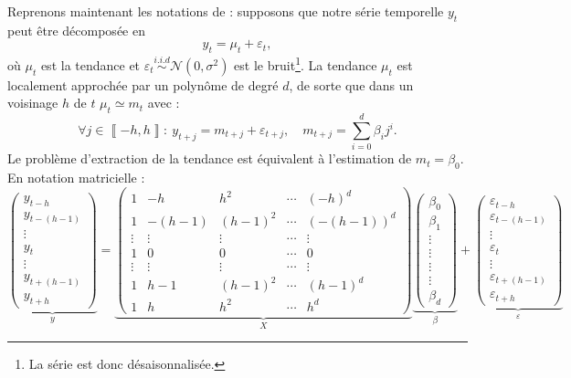 \documentclass[
  12pt,
  french,
  12pt,a4paper]{article}
\newcommand\1{\mathds{1}}
\begin{document}
Reprenons maintenant les notations de \textcite{proietti2008} : supposons que notre série temporelle \(y_t\) peut être décomposée en
\[
y_t=\mu_t+\varepsilon_t,
\]
où \(\mu_t\) est la tendance et \(\varepsilon_{t}\overset{i.i.d}{\sim}\mathcal{N}(0,\sigma^{2})\) est le bruit\footnote{La série est donc désaisonnalisée.}.
La tendance \(\mu_t\) est localement approchée par un polynôme de degré \(d\), de sorte que dans un voisinage \(h\) de \(t\) \(\mu_t\simeq m_{t}\) avec :
\[
\forall j\in\left\llbracket -h,h\right\rrbracket :\:
y_{t+j}=m_{t+j}+\varepsilon_{t+j},\quad m_{t+j}=\sum_{i=0}^{d}\beta_{i}j^{i}.
\]
Le problème d'extraction de la tendance est équivalent à l'estimation de \(m_t=\beta_0\).
En notation matricielle :
\[
\underbrace{\begin{pmatrix}y_{t-h}\\
y_{t-(h-1)}\\
\vdots\\
y_{t}\\
\vdots\\
y_{t+(h-1)}\\
y_{t+h}
\end{pmatrix}}_{y}=\underbrace{\begin{pmatrix}1 & -h & h^{2} & \cdots & (-h)^{d}\\
1 & -(h-1) & (h-1)^{2} & \cdots & (-(h-1))^{d}\\
\vdots & \vdots & \vdots & \cdots & \vdots\\
1 & 0 & 0 & \cdots & 0\\
\vdots & \vdots & \vdots & \cdots & \vdots\\
1 & h-1 & (h-1)^{2} & \cdots & (h-1)^{d}\\
1 & h & h^{2} & \cdots & h^{d}
\end{pmatrix}}_{X}\underbrace{\begin{pmatrix}\beta_{0}\\
\beta_{1}\\
\vdots\\
\vdots\\
\vdots\\
\vdots\\
\beta_{d}
\end{pmatrix}}_{\beta}+\underbrace{\begin{pmatrix}\varepsilon_{t-h}\\
\varepsilon_{t-(h-1)}\\
\vdots\\
\varepsilon_{t}\\
\vdots\\
\varepsilon_{t+(h-1)}\\
\varepsilon_{t+h}
\end{pmatrix}}_{\varepsilon}
\]
\end{document}
